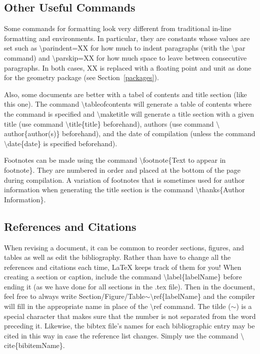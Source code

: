 \documentclass[10pt]{article}
\begin{document}
\subsection{Other Useful Commands\label{usefulCmds}}
Some commands for formatting look very different from traditional in-line formatting and environments.  In particular, they are constants whose values are set such as $ \setminus $parindent=XX for how much to indent paragraphs (with the $ \setminus $par command) and $ \setminus $parskip=XX for how much space to leave between consecutive paragraphs.  In both cases, XX is replaced with a floating point and unit as done for the geometry package (see Section~\ref{packages}).
\par
Also, some documents are better with a tabel of contents and title section (like this one).  The command $ \setminus $tableofcontents will generate a table of contents where the command is specified and $ \setminus $maketitle will generate a title section with a given title (use command $ \setminus $title\{title\} beforehand), authors (use command $ \setminus $author\{author(s)\} beforehand), and the date of compilation (unless the command $ \setminus $date\{date\} is specified beforehand).
\par
Footnotes can be made using the command $ \setminus $footnote\{Text to appear in footnote\}.  They are numbered in order and placed at the bottom of the page during compilation.  A variation of footnotes that is sometimes used for author information when generating the title section is the command $ \setminus $thanks\{Author Information\}.
\subsection{References and Citations\label{references}}
When revising a document, it can be common to reorder sections, figures, and tables as well as edit the bibliography.  Rather than have to change all the references and citations each time, LaTeX keeps track of them for you!  When creating a section or caption, include the command $ \setminus $label\{labelName\} before ending it (as we have done for all sections in the .tex file).  Then in the document, feel free to always write Section/Figure/Table$ \sim\setminus $ref\{labelName\} and the compiler will fill in the appropriate name in place of the $ \setminus $ref command.  The tilde ($ \sim $) is a special character that makes sure that the number is not separated from the word preceding it.  Likewise, the bibtex file's names for each bibliographic entry may be cited in this way in case the reference list changes.  Simply use the command $ \setminus $cite\{bibitemName\}.
\end{document}
